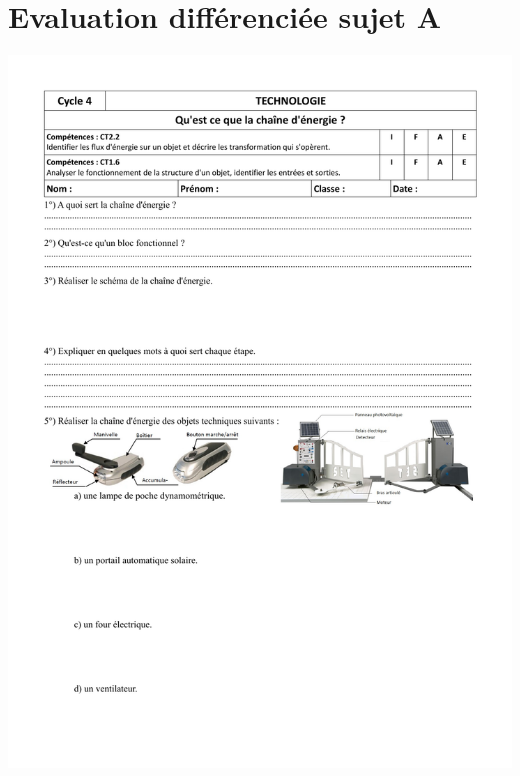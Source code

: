 \section{Evaluation différenciée sujet A}\label{annexe:evaluation_chaine_energie_A}
\includegraphics[scale=0.6]{./ressources/Controle_chaine_energie_A.pdf} 

